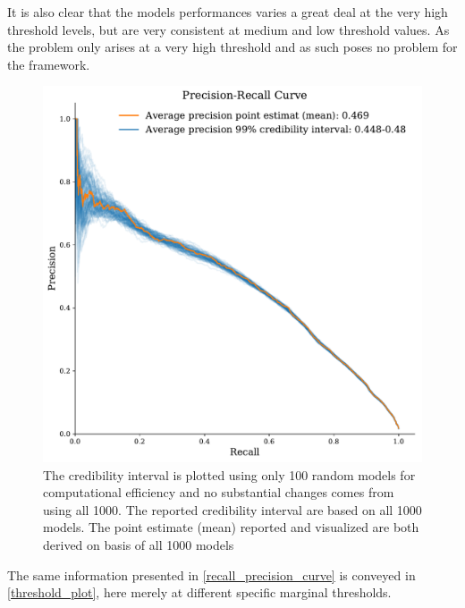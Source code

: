 \documentclass[a4paper]{article}
\begin{document}
It is also clear that the models performances varies a great deal at the very high threshold levels, but are very consistent at medium and low threshold values. As the problem only arises at a very high threshold and as such poses no problem for the framework.\par 


\begin{figure}[!htb]
	\centering
	\includegraphics[scale=0.5]{pr_curve.pdf}
    \caption{\footnotesize{The credibility interval is plotted using only 100 random models for computational efficiency and no substantial changes comes from using all 1000. The reported credibility interval are based on all 1000 models. The point estimate (mean) reported and visualized are both derived on basis of all 1000 models}}\label{recall_precision_curve}
\end{figure}


The same information presented in \autoref{recall_precision_curve} is conveyed in \autoref{threshold_plot}, here merely at different specific marginal thresholds.\par
\end{document}
